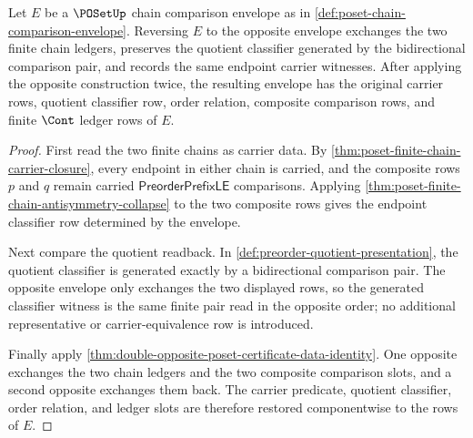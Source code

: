 \begin{theorem}
\label{thm:poset-chain-envelope-opposite-stability}
Let $E$ be a $\POSetUp$ chain comparison envelope as in
\autoref{def:poset-chain-comparison-envelope}. Reversing $E$ to the opposite
envelope exchanges the two finite chain ledgers, preserves the quotient
classifier generated by the bidirectional comparison pair, and records the
same endpoint carrier witnesses. After applying the opposite construction
twice, the resulting envelope has the original carrier rows, quotient
classifier row, order relation, composite comparison rows, and finite $\Cont$
ledger rows of $E$.
\end{theorem}
\begin{proof}
First read the two finite chains as carrier data. By
\autoref{thm:poset-finite-chain-carrier-closure}, every endpoint in either
chain is carried, and the composite rows $p$ and $q$ remain carried
$\mathsf{PreorderPrefixLE}$ comparisons. Applying
\autoref{thm:poset-finite-chain-antisymmetry-collapse} to the two composite
rows gives the endpoint classifier row determined by the envelope.

Next compare the quotient readback. In
\autoref{def:preorder-quotient-presentation}, the quotient classifier is
generated exactly by a bidirectional comparison pair. The opposite envelope
only exchanges the two displayed rows, so the generated classifier witness is
the same finite pair read in the opposite order; no additional representative
or carrier-equivalence row is introduced.

Finally apply
\autoref{thm:double-opposite-poset-certificate-data-identity}. One opposite
exchanges the two chain ledgers and the two composite comparison slots, and a
second opposite exchanges them back. The carrier predicate, quotient
classifier, order relation, and ledger slots are therefore restored
componentwise to the rows of $E$.
\end{proof}



